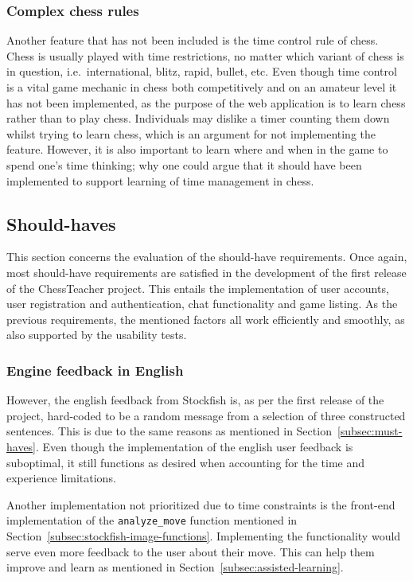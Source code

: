 
\subsubsection{Complex chess rules}

Another feature that has not been included is the time control rule of chess.
Chess is usually played with time restrictions, no matter which variant of chess is in question, i.e.\ international,
blitz, rapid, bullet, etc.
Even though time control is a vital game mechanic in chess both competitively and on an amateur level it has not been
implemented, as the purpose of the web application is to learn chess rather than to play chess.
Individuals may dislike a timer counting them down whilst trying to learn chess, which is an argument for not
implementing the feature.
However, it is also important to learn where and when in the game to spend one's time thinking; why one could argue that
it should have been implemented to support learning of time management in chess.


\subsection{Should-haves}\label{subsec:should-haves}

This section concerns the evaluation of the should-have requirements.
Once again, most should-have requirements are satisfied in the development of the first release of the ChessTeacher
project.
This entails the implementation of user accounts, user registration and authentication, chat functionality and game
listing.
As the previous requirements, the mentioned factors all work efficiently and smoothly,
as also supported by the usability tests.


\subsubsection{Engine feedback in English}

However, the english feedback from Stockfish is, as per the first release of the project, hard-coded to be a random
message from a selection of three constructed sentences.
This is due to the same reasons as mentioned in Section~\ref{subsec:must-haves}.
Even though the implementation of the english user feedback is suboptimal, it still functions as desired when accounting
for the time and experience limitations.

Another implementation not prioritized due to time constraints is the front-end implementation of the
\verb|analyze_move| function mentioned in Section~\ref{subsec:stockfish-image-functions}.
Implementing the functionality would serve even more feedback to the user about their move.
This can help them improve and learn as mentioned in Section~\ref{subsec:assisted-learning}.
